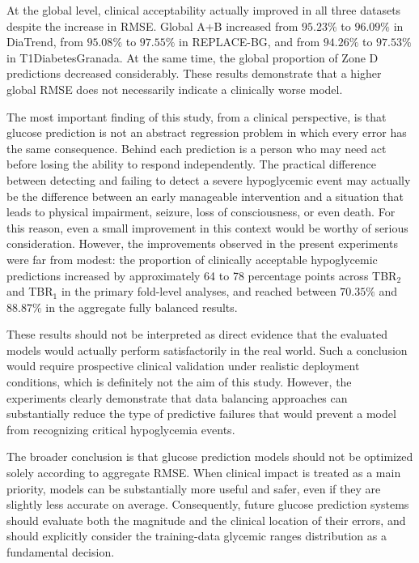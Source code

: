 At the global level, clinical acceptability actually improved in all three datasets despite the increase in RMSE. Global A+B increased from \(95.23\%\) to \(96.09\%\) in DiaTrend, from \(95.08\%\) to \(97.55\%\) in REPLACE-BG, and from \(94.26\%\) to \(97.53\%\) in T1DiabetesGranada. At the same time, the global proportion of Zone D predictions decreased considerably. These results demonstrate that a higher global RMSE does not necessarily indicate a clinically worse model.
    
The most important finding of this study, from a clinical perspective, is that glucose prediction is not an abstract regression problem in which every error has the same consequence. Behind each prediction is a person who may need act before losing the ability to respond independently. The practical difference between detecting and failing to detect a severe hypoglycemic event may actually be the difference between an early manageable intervention and a situation that leads to physical impairment, seizure, loss of consciousness, or even death. For this reason, even a small improvement in this context would be worthy of serious consideration. However, the improvements observed in the present experiments were far from modest: the proportion of clinically acceptable hypoglycemic predictions increased by approximately 64 to 78 percentage points across TBR$_2$ and TBR$_1$ in the primary fold-level analyses, and reached between \(70.35\%\) and \(88.87\%\) in the aggregate fully balanced results.

These results should not be interpreted as direct evidence that the evaluated models would actually perform satisfactorily in the real world. Such a conclusion would require prospective clinical validation under realistic deployment conditions, which is definitely not the aim of this study. However, the experiments clearly demonstrate that data balancing approaches can substantially reduce the type of predictive failures that would prevent a model from recognizing critical hypoglycemia events.

The broader conclusion is that glucose prediction models should not be optimized solely according to aggregate RMSE. When clinical impact is treated as a main priority, models can be substantially more useful and safer, even if they are slightly less accurate on average.  Consequently, future glucose prediction systems should evaluate both the magnitude and the clinical location of their errors, and should explicitly consider the training-data glycemic ranges distribution as a fundamental decision.

